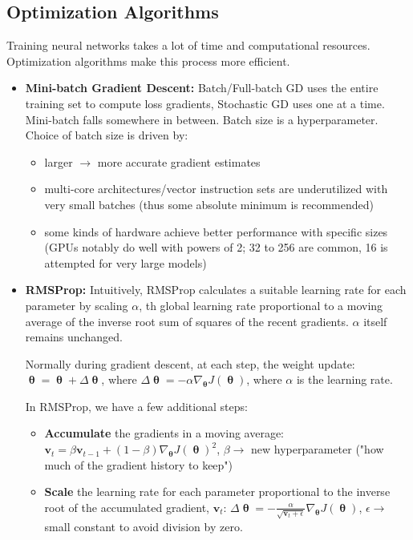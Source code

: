\subsection*{Optimization Algorithms}
Training neural networks takes a lot of time and computational resources. Optimization algorithms make this process more efficient.
\begin{itemize}
  \item \textbf{Mini-batch Gradient Descent:} Batch/Full-batch GD uses the entire training set to compute loss gradients, Stochastic GD uses one at a time. Mini-batch falls somewhere in between. Batch size is a hyperparameter. Choice of batch size is driven by:
    \begin{itemize}
      \item larger $\rightarrow$ more accurate gradient estimates 
      \item multi-core architectures/vector instruction sets are underutilized with very small batches (thus some absolute minimum is recommended)
      \item some kinds of hardware achieve better performance with specific sizes (GPUs notably do well with powers of 2; 32 to 256 are common, 16 is attempted for very large models)
    \end{itemize}
  \item \textbf{RMSProp:} Intuitively, RMSProp calculates a suitable learning rate for each parameter by scaling $\alpha$, th global learning rate proportional to a moving average of the inverse root sum of squares of the recent gradients. $\alpha$ itself remains unchanged.

    Normally during gradient descent, at each step, the weight update: $\boldsymbol{\uptheta} = \boldsymbol{\uptheta} + \Delta \boldsymbol{\uptheta}$, where $\Delta \boldsymbol{\uptheta} = -\alpha \nabla_{\boldsymbol{\uptheta}} J(\boldsymbol{\uptheta})$, where $\alpha$ is the learning rate.

    In RMSProp, we have a few additional steps:

    \begin{itemize}
      \item \textbf{Accumulate} the gradients in a moving average: $\mathbf{v}_t = \beta \mathbf{v}_{t-1} + (1 - \beta) \nabla_{\boldsymbol{\uptheta}} J(\boldsymbol{\uptheta})^2$, $\beta \rightarrow$ new hyperparameter ("how much of the gradient history to keep")
      \item \textbf{Scale} the learning rate for each parameter proportional to the inverse root of the accumulated gradient, $\mathbf{v}_t$: $\Delta \boldsymbol{\uptheta} = -\frac{\alpha}{\sqrt{\mathbf{v}_t + \epsilon}} \nabla_{\boldsymbol{\uptheta}} J(\boldsymbol{\uptheta})$, $\epsilon \rightarrow$ small constant to avoid division by zero.
    \end{itemize}


\end{itemize}
